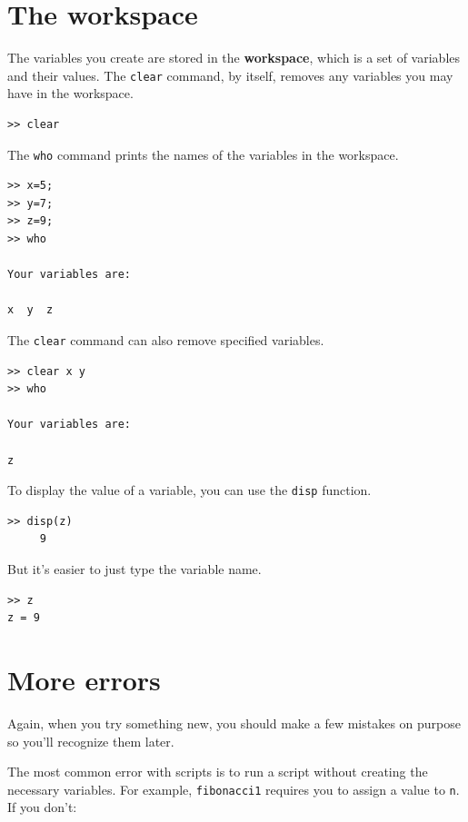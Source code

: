 \documentclass{book}
\begin{document}
\section{The workspace}

The variables you create are stored in the {\bf workspace}, which is a
set of variables and their values.  
The {\tt clear} command, by itself, removes any variables you may
have in the workspace.

\begin{verbatim}
>> clear
\end{verbatim}

The {\tt who} command prints the
names of the variables in the workspace. 

\begin{verbatim}
>> x=5;
>> y=7;
>> z=9;
>> who

Your variables are:

x  y  z  
\end{verbatim}

The {\tt clear} command can also remove specified variables.

\begin{verbatim}
>> clear x y
>> who

Your variables are:

z  
\end{verbatim}

To display the value of a variable, you can use the {\tt disp}
function.

\begin{verbatim}
>> disp(z)
     9
\end{verbatim}

But it's easier to just type the variable name.

\begin{verbatim}
>> z
z = 9
\end{verbatim}

\section{More errors}

Again, when you try something new, you should make a few mistakes
on purpose so you'll recognize them later.

The most common error with scripts is to run a script without creating
the necessary variables.  For example, {\tt fibonacci1} requires you
to assign a value to {\tt n}.  If you don't:
\end{document}
